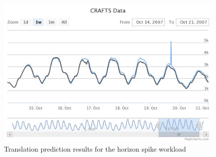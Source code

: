 \begin{figure}[H]
\centering
\includegraphics[width=\textwidth]{results/graphs/translation_horizon_spike.png}
\caption{Translation prediction results for the horizon spike workload}
\label{fig:translation_hs}
\end{figure}